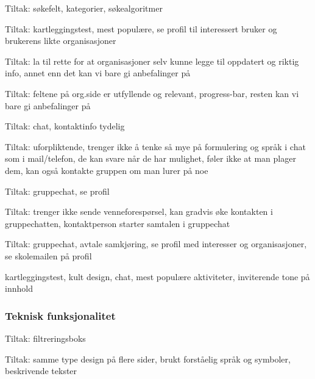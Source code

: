 Tiltak: søkefelt, kategorier, søkealgoritmer

Tiltak: kartleggingstest, mest populære, se profil til interessert bruker og brukerens likte organisasjoner

Tiltak: la til rette for at organisasjoner selv kunne legge til oppdatert og riktig info, annet enn det kan vi bare gi anbefalinger på

Tiltak: feltene på org.side er utfyllende og relevant, progress-bar, resten kan vi bare gi anbefalinger på

Tiltak: chat, kontaktinfo tydelig

Tiltak: uforpliktende, trenger ikke å tenke så mye på formulering og språk i chat som i mail/telefon, de kan svare når de har mulighet, føler ikke at man plager dem, kan også kontakte gruppen om man lurer på noe

Tiltak: gruppechat, se profil

Tiltak: trenger ikke sende venneforespørsel, kan gradvis øke kontakten i gruppechatten, kontaktperson starter samtalen i gruppechat 

Tiltak: gruppechat, avtale samkjøring, se profil med interesser og organisasjoner, se skolemailen på profil

kartleggingstest, kult design, chat, mest populære aktiviteter, inviterende tone på innhold


\subsubsection{Teknisk funksjonalitet}
Tiltak: filtreringsboks

Tiltak: samme type design på flere sider, brukt forståelig språk og symboler, beskrivende tekster

